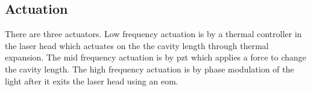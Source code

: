 \subsection{Actuation}

There are three actuators. Low frequency actuation is by a thermal controller in
the laser head which actuates on the the cavity length through thermal expansion.
The mid frequency actuation is by \ac{pzt} which applies a force to change the
cavity length. The high frequency actuation is by phase modulation of the light
after it exits the laser head using an \ac{eom}.


%







